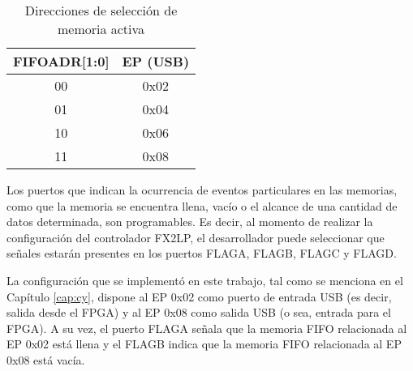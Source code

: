 	\begin{table}[ht]
		\centering
		\begin{tabular}{cc}
			\hline
			FIFOADR[1:0] & EP (USB)\\
			\hline
			00 & 0x02\\
			01 & 0x04\\
			10 & 0x06\\
			11 & 0x08\\
			\hline
		\end{tabular}
		\caption{Direcciones de selección de memoria activa}
		\label{tab:fifoadr}
	\end{table}
	
	Los puertos que indican la ocurrencia de eventos particulares en las memorias, como que la memoria se encuentra llena, vacío o el alcance de una cantidad de datos determinada, son programables. Es decir, al momento de realizar la configuración del controlador FX2LP, el desarrollador puede seleccionar que señales estarán presentes en los puertos FLAGA, FLAGB, FLAGC y FLAGD.
	
	La configuración que se implementó en este trabajo, tal como se menciona en el Capítulo \ref{cap:cy}, dispone al EP 0x02 como puerto de entrada USB (es decir, salida desde el FPGA) y al EP 0x08 como salida USB (o sea, entrada para el FPGA). A su vez, el puerto FLAGA señala que la memoria FIFO relacionada al EP 0x02 está llena y el FLAGB indica que la memoria FIFO relacionada al EP 0x08 está vacía.
	

